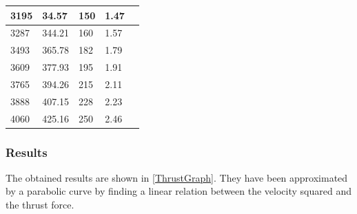 \begin{table}[H]
\begin{tabular}{|l|l|l|l|p{4.3cm}|}
		\hline%
		3195 						       &  34.57			           & 150                      & 1.47         \\
		\hline%
		3287                               &  344.21  			               & 160                      & 1.57         \\
		\hline%
		3493                               &  365.78                          & 182                      & 1.79         \\
		\hline%
		3609 					           &  377.93	                       & 195                      & 1.91         \\
		\hline%
		3765 						       &  394.26	                   & 215                      & 2.11         \\
		\hline%
		3888 						       &  407.15		                   & 228                      & 2.23         \\
		\hline%
		4060 						       &  425.16	                   & 250                      & 2.46         \\
		\hline%
				
	\end{tabular}
\end{table}
\subsubsection{Results}
The obtained results are shown in \autoref{ThrustGraph}. They have been approximated by a parabolic curve by finding a linear relation between the velocity squared and the thrust force.

